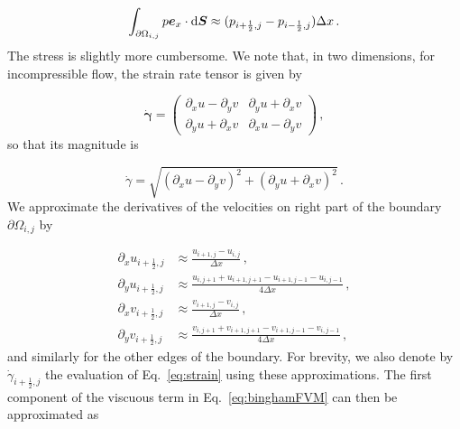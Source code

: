 \documentclass[final,3p,twocolumn]{elsarticle}
\begin{document}
\begin{equation}
    \int_{\partial \Omega_{i,j}} p \bm{e}_x \cdot {\rm d}\bm{S} \approx
    (p_{i+\frac{1}{2},j}-p_{i-\frac{1}{2},j}) \Delta x \,.
\end{equation}
%
The stress is slightly more cumbersome. We note that, in two dimensions, for
incompressible flow, the strain rate tensor is given by 

\begin{equation}
    \dot{\bm{\gamma}} = 
    \begin{pmatrix}
        \partial_x u - \partial_y v & \partial_y u + \partial_x v \\
        \partial_y u + \partial_x v & \partial_x u - \partial_y v
    \end{pmatrix} \,,
\end{equation}
%
so that its magnitude is 

\begin{equation}
    \dot{\gamma} = \sqrt{(\partial_x u - \partial_y v)^2+(\partial_y u +
    \partial_x v)^2} \,.
    \label{eq:strain}
\end{equation}
%
We approximate the derivatives of the velocities on right part of the boundary $\partial
\Omega_{i,j}$ by 

\begin{align}
    \nonumber 
    \partial_x u_{i+\frac{1}{2},j} &\approx \frac{u_{i+1,j}-u_{i,j}}{\Delta x}
    \,, \\
    \nonumber 
    \partial_y u_{i+\frac{1}{2},j} &\approx
    \frac{u_{i,j+1}+u_{i+1,j+1}-u_{i+1,j-1}-u_{i,j-1}}{4\Delta x} \,, \\
    \nonumber
    \partial_x v_{i+\frac{1}{2},j} &\approx \frac{v_{i+1,j}-v_{i,j}}{\Delta x}
    \,, \\
    \partial_y v_{i+\frac{1}{2},j} &\approx
    \frac{v_{i,j+1}+v_{i+1,j+1}-v_{i+1,j-1}-v_{i,j-1}}{4\Delta x} \,,
\end{align}
%
and similarly for the other edges of the boundary. For brevity, we also denote
by $\dot{\gamma}_{i+\frac{1}{2},j}$ the evaluation of Eq.\ \eqref{eq:strain}
using these approximations. The first component of the viscuous term in Eq.\
\eqref{eq:binghamFVM} can then be approximated as
\end{document}
